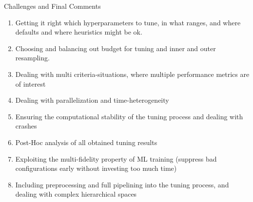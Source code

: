 \documentclass[11pt,compress,t,notes=noshow, xcolor=table]{beamer}
\begin{document}
\begin{frame}[allowframebreaks]{Challenges and Final Comments}
\begin{enumerate}
  \item Getting it right which hyperparameters to tune, in what ranges, and where defaults and where heuristics might be ok.
  \item Choosing and balancing out budget for tuning and inner and outer resampling.
  \item Dealing with multi criteria-situations, where multiple performance metrics are of interest
  \item Dealing with parallelization and time-heterogeneity    
  \item Ensuring the computational stability of the tuning process and dealing with crashes
    

  \item Post-Hoc analysis of all obtained tuning results
  \item Exploiting the multi-fidelity property of ML training (suppress bad configurations early without investing too much time)
  \item Including preprocessing and full pipelining into the tuning process, and dealing with complex hierarchical spaces
 \end{enumerate}

\end{frame}


\endlecture
\end{document}

